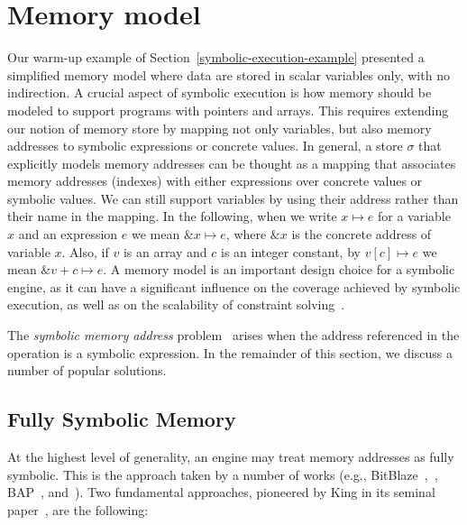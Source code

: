 

\section{Memory model}
\label{memory-model}

Our warm-up example of Section~\ref{symbolic-execution-example} presented a simplified memory model where data are stored in scalar variables only, with no indirection. A crucial aspect of symbolic execution is how memory should be modeled to support programs with pointers and arrays. This requires extending our notion of memory store by mapping not only variables, but also memory addresses to symbolic expressions or concrete values. In general, a store $\sigma$ that explicitly models memory addresses can be thought as a mapping that associates memory addresses (indexes) with either expressions over concrete values or symbolic values. We can still support variables by using their address rather than their name in the mapping. In the following, when we write $x\mapsto e$ for a variable $x$ and an expression $e$ we mean $\&x\mapsto e$, where $\&x$ is the concrete address of variable $x$. Also, if $v$ is an array and $c$ is an integer constant, by $v[c]\mapsto e$ we mean $\&v+c\mapsto e$. A memory model is an important design choice for a symbolic engine, as it can have a significant influence on the coverage achieved by symbolic execution, as well as on the scalability of constraint solving~\cite{CS-CACM13}.

The {\em symbolic memory address} problem~\cite{SAB-SP10} arises when the address referenced in the operation is a symbolic expression. In the remainder of this section, we discuss a number of popular solutions.

\subsection{Fully Symbolic Memory}
\label{ss:fully-symbolic-memory}

At the highest level of generality, an engine may treat memory addresses as fully symbolic. This is the approach taken by a number of works (e.g., {\sc BitBlaze}~\cite{BITBLAZE-ICISS08},~\cite{TLL-CAV10}, {\sc BAP}~\cite{BAP-CAV11}, and~\cite{TS-ATVA14}). Two fundamental approaches, pioneered by King in its seminal paper~\cite{K-CACM76}, are the following:

